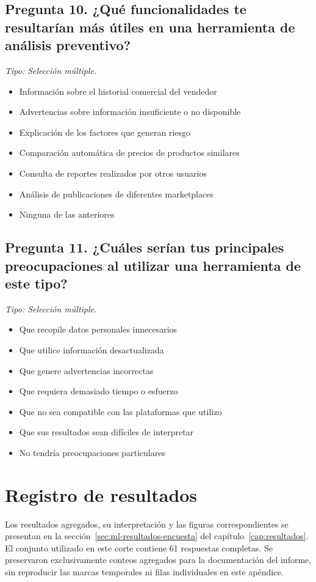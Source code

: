 \subsection*{Pregunta 10. ¿Qué funcionalidades te resultarían más útiles en una herramienta de análisis preventivo?}
\noindent\textit{Tipo: Selección múltiple.}
\begin{itemize}\setlength\itemsep{1pt}
\item Información sobre el historial comercial del vendedor
\item Advertencias sobre información insuficiente o no disponible
\item Explicación de los factores que generan riesgo
\item Comparación automática de precios de productos similares
\item Consulta de reportes realizados por otros usuarios
\item Análisis de publicaciones de diferentes marketplaces
\item Ninguna de las anteriores
\end{itemize}
\subsection*{Pregunta 11. ¿Cuáles serían tus principales preocupaciones al utilizar una herramienta de este tipo?}
\noindent\textit{Tipo: Selección múltiple.}
\begin{itemize}\setlength\itemsep{1pt}
\item Que recopile datos personales innecesarios
\item Que utilice información desactualizada
\item Que genere advertencias incorrectas
\item Que requiera demasiado tiempo o esfuerzo
\item Que no sea compatible con las plataformas que utilizo
\item Que sus resultados sean difíciles de interpretar
\item No tendría preocupaciones particulares
\end{itemize}

\section{Registro de resultados}

Los resultados agregados, su interpretación y las figuras correspondientes se presentan en la sección~\ref{sec:ml-resultados-encuesta} del capítulo~\ref{cap:resultados}. El conjunto utilizado en este corte contiene 61 respuestas completas. Se preservaron exclusivamente conteos agregados para la documentación del informe, sin reproducir las marcas temporales ni filas individuales en este apéndice.
